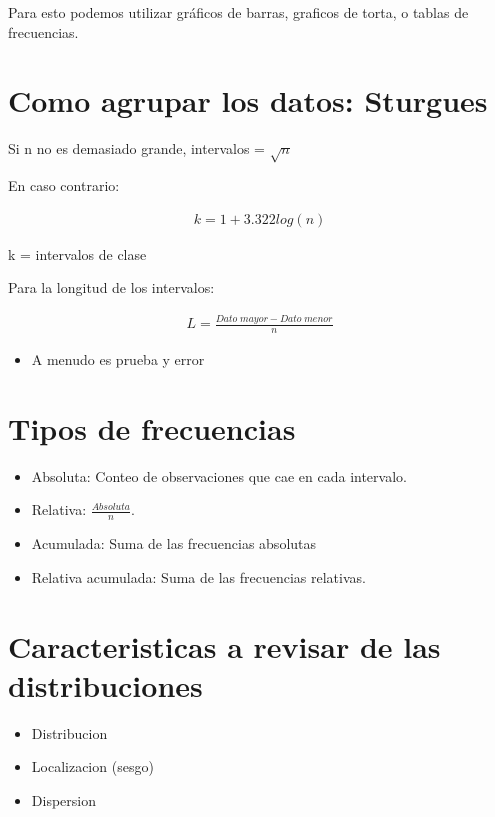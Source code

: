 \documentclass[twocolumn]{article}
\providecommand{\tightlist}{%
  \setlength{\itemsep}{0pt}\setlength{\parskip}{0pt}}
\begin{document}
Para esto podemos utilizar gráficos de barras, graficos de torta, o
tablas de frecuencias.

\section{Como agrupar los datos:
Sturgues}\label{como-agrupar-los-datos-sturgues}

Si n no es demasiado grande, intervalos = \(\sqrt{n}\)

En caso contrario:

\begin{align}
k = 1 + 3.322 log(n)
\end{align}

k = intervalos de clase

Para la longitud de los intervalos:

\begin{align}
L = \frac{Dato \; mayor - Dato \; menor}{n}
\end{align}

\begin{itemize}
\tightlist
\item
  A menudo es prueba y error
\end{itemize}

\section{Tipos de frecuencias}\label{tipos-de-frecuencias}

\begin{itemize}
\tightlist
\item
  Absoluta: Conteo de observaciones que cae en cada intervalo.
\item
  Relativa: \(\frac{Absoluta}{n}\).
\item
  Acumulada: Suma de las frecuencias absolutas
\item
  Relativa acumulada: Suma de las frecuencias relativas.
\end{itemize}

\section{Caracteristicas a revisar de las
distribuciones}\label{caracteristicas-a-revisar-de-las-distribuciones}

\begin{itemize}
\tightlist
\item
  Distribucion
\item
  Localizacion (sesgo)
\item
  Dispersion
\end{itemize}
\end{document}
